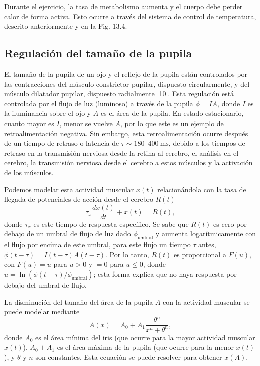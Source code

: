 \documentclass[12pt]{book}
\begin{document}
Durante el ejercicio, la tasa de metabolismo aumenta y el cuerpo debe perder calor de forma activa. Esto ocurre a través del sistema de control de temperatura, descrito anteriormente y en la Fig. 13.4.

\subsection{Regulación del tamaño de la pupila}
\label{subsec:13.2.4}

El tamaño de la pupila de un ojo y el reflejo de la pupila están controlados por las contracciones del músculo constrictor pupilar, dispuesto circularmente, y del músculo dilatador pupilar, dispuesto radialmente [10]. Esta regulación está controlada por el flujo de luz (luminoso) a través de la pupila $\phi = I A$, donde $I$ es la iluminancia sobre el ojo y $A$ es el área de la pupila. En estado estacionario, cuanto mayor es $I$, menor se vuelve $A$, por lo que este es un ejemplo de retroalimentación negativa. Sin embargo, esta retroalimentación ocurre después de un tiempo de retraso o latencia de $\tau \sim 180\text{--}400\ \text{ms}$, debido a los tiempos de retraso en la transmisión nerviosa desde la retina al cerebro, el análisis en el cerebro, la transmisión nerviosa desde el cerebro a estos músculos y la activación de los músculos.

Podemos modelar esta actividad muscular $x(t)$ relacionándola con la tasa de llegada de potenciales de acción desde el cerebro $R(t)$
\begin{equation}
  \tau_x \frac{dx(t)}{dt} + x(t) = R(t), \label{eq:13.37}
\end{equation}
donde $\tau_x$ es este tiempo de respuesta específico. Se sabe que $R(t)$ es cero por debajo de un umbral de flujo de luz dado $\phi_{\text{umbral}}$ y aumenta logarítmicamente con el flujo por encima de este umbral, para este flujo un tiempo $\tau$ antes, $\phi(t - \tau) = I(t - \tau) A(t - \tau)$. Por lo tanto, $R(t)$ es proporcional a $F(u)$, con $F(u) = u$ para $u > 0$ y $= 0$ para $u \le 0$, donde $u = \ln(\phi(t - \tau)/\phi_{\text{umbral}})$; esta forma explica que no haya respuesta por debajo del umbral de flujo.

La disminución del tamaño del área de la pupila $A$ con la actividad muscular se puede modelar mediante
\begin{equation}
  A(x) = A_0 + A_1 \frac{\theta^n}{x^n + \theta^n}, \label{eq:13.38}
\end{equation}
donde $A_0$ es el área mínima del iris (que ocurre para la mayor actividad muscular $x(t)$), $A_0 + A_1$ es el área máxima de la pupila (que ocurre para la menor $x(t)$), y $\theta$ y $n$ son constantes. Esta ecuación se puede resolver para obtener $x(A)$.
\end{document}
